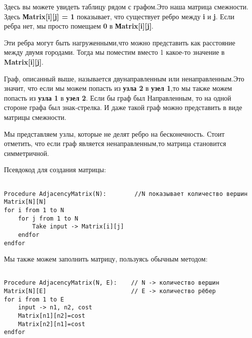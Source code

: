 Здесь вы можете увидеть таблицу рядом с графом.Это наша матрица
смежности. Здесь \textbf{Мatrix[i][j] = 1} показывает, что существует ребро между \textbf{i} и \textbf{j}. Если ребра нет, мы просто помещаем \textbf{0} в \textbf{Мatrix[i][j]}.

\vspace{\baselineskip}
Эти ребра могут быть нагруженными,что можно представить как расстояние между двумя городами. Тогда мы поместим вместо 1 какое-то значение в \textbf{Matrix[i][j]}.

\vspace{\baselineskip}
Граф, описанный выше, называется двунаправленным или ненаправленным.Это значит, что если мы можем попасть из \textbf{узла 2} в \textbf{узел 1},то  мы также можем попасть из \textbf{узла 1} в \textbf{узел 2}. Если бы  граф был Направленным, то на одной стороне графа был знак-стрелка. И даже такой граф можно представить в виде матрицы смежности.


Мы представляем узлы, которые не делят ребро на бесконечность. Стоит отметить, что если граф является ненаправленным,то матрица становится симметричной.

\vspace{\baselineskip}
Псевдокод для создания матрицы:

\vspace{\baselineskip}
\begin{tcolorbox}
\begin{verbatim}

Procedure AdjacencyMatrix(N):        //N показывает количество вершин
Matrix[N][N]
for i from 1 to N           
    for j from 1 to N
        Take input -> Matrix[i][j]
    endfor
endfor

\end{verbatim}
\end{tcolorbox}

\vspace{\baselineskip}
Мы также можем заполнить матрицу, пользуясь обычным методом:

\vspace{\baselineskip}
\begin{tcolorbox}
\begin{verbatim}

Procedure AdjacencyMatrix(N, E):    // N -> количество вершин
Matrix[N][E]       				    // E -> количество рёбер
for i from 1 to E
    input -> n1, n2, cost
    Matrix[n1][n2]=cost
    Matrix[n2][n1]=cost
endfor

\end{verbatim}
\end{tcolorbox}

